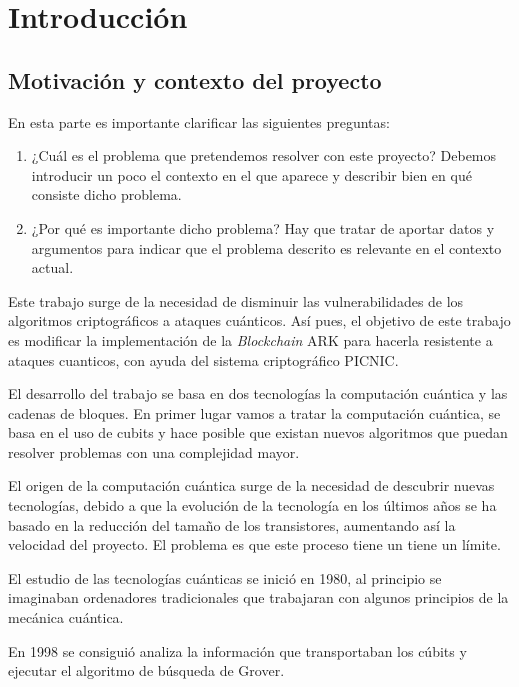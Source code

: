 \chapter{Introducción}


\section{Motivación y contexto del proyecto}
\label{sec:intro:motivacion} %

En esta parte es importante clarificar las siguientes preguntas: 
\begin{enumerate}
\item ¿Cuál es el problema que pretendemos resolver con este proyecto? Debemos introducir un poco el contexto en el que aparece y describir bien en qué consiste dicho problema. 
\item ¿Por qué es importante dicho problema? Hay que tratar de aportar datos y argumentos para indicar que el problema descrito es relevante en el contexto actual. 
\end{enumerate}

Este trabajo surge de la necesidad de disminuir las vulnerabilidades de los algoritmos criptográficos a ataques cuánticos. Así pues, el objetivo de este trabajo es modificar la implementación de la \textit{Blockchain} ARK para hacerla resistente a ataques cuanticos, con ayuda del sistema criptográfico PICNIC.

El desarrollo del trabajo se basa en dos tecnologías la computación cuántica y las cadenas de bloques. En primer lugar vamos a tratar la computación cuántica, se basa en el uso de cubits y hace posible que existan nuevos algoritmos que puedan resolver problemas con una complejidad mayor.

El origen de la computación cuántica surge de la necesidad de descubrir nuevas tecnologías, debido a que la evolución de la tecnología en los últimos años se ha basado en la reducción del tamaño de los transistores, aumentando así la velocidad del proyecto. El problema es que este proceso tiene un tiene un límite.

El estudio de las tecnologías cuánticas se inició en 1980, al principio se imaginaban ordenadores tradicionales que trabajaran con algunos principios de la mecánica cuántica.

En 1998 se consiguió analiza la información que transportaban los cúbits y ejecutar el algoritmo de búsqueda de Grover.

